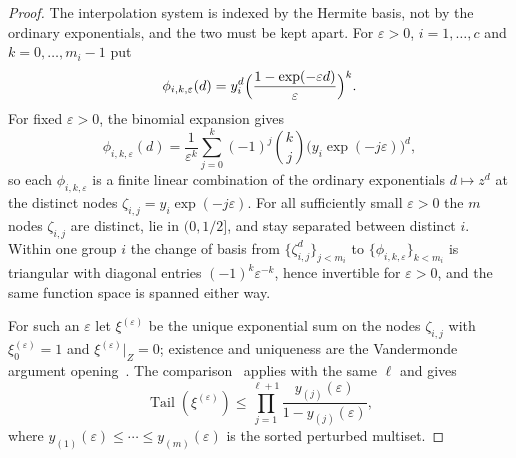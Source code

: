 \documentclass[11pt]{article}
\theoremstyle{definition}
\theoremstyle{plain}
\DeclareMathOperator{\Tail}{Tail}
\begin{document}
\begin{proof}
The interpolation system is indexed by the Hermite basis, not by the
ordinary exponentials, and the two must be kept apart.  For
$\varepsilon>0$, $i=1,\ldots,c$ and $k=0,\ldots,m_i-1$ put
\[
  \phi_{i,k,\varepsilon}(d)
  =y_i^d\Bigl(\frac{1-\exp(-\varepsilon d)}{\varepsilon}\Bigr)^k .
\]
For fixed $\varepsilon>0$, the binomial expansion gives
\[
  \phi_{i,k,\varepsilon}(d)
  =\frac1{\varepsilon^k}\sum_{j=0}^{k}(-1)^j\binom{k}{j}
    \bigl(y_i\exp(-j\varepsilon)\bigr)^d,
\]
so each $\phi_{i,k,\varepsilon}$ is a finite linear combination of the
ordinary exponentials $d\mapsto z^d$ at the distinct nodes
$\zeta_{i,j}=y_i\exp(-j\varepsilon)$.  For all sufficiently small $\varepsilon>0$ the $m$
nodes $\zeta_{i,j}$ are distinct, lie in $(0,1/2]$, and stay separated between
distinct $i$.  Within one group $i$ the change of basis from
$\{\zeta_{i,j}^{d}\}_{j<m_i}$ to
$\{\phi_{i,k,\varepsilon}\}_{k<m_i}$ is triangular with diagonal entries
$(-1)^k\varepsilon^{-k}$, hence invertible for $\varepsilon>0$, and the same
function space is spanned either way.

For such an $\varepsilon$ let $\xi^{(\varepsilon)}$ be the unique exponential
sum on the nodes $\zeta_{i,j}$ with $\xi^{(\varepsilon)}_0=1$ and
$\xi^{(\varepsilon)}|_Z=0$; existence and uniqueness are the
Vandermonde argument opening~\cite[Section~2]{coefficient-mass}.
The comparison~\cite[Theorem~2.2]{coefficient-mass} applies with the same $\ell$ and gives
\[
  \Tail(\xi^{(\varepsilon)})
  \le\prod_{j=1}^{\ell+1}\frac{y_{(j)}(\varepsilon)}{1-y_{(j)}(\varepsilon)},
\]
where $y_{(1)}(\varepsilon)\le\cdots\le y_{(m)}(\varepsilon)$ is the sorted
perturbed multiset.


\end{proof}
\end{document}
